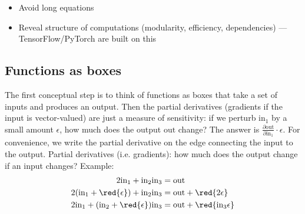 \begin{itemize}
\item Avoid long equations
\item Reveal structure of computations (modularity, efficiency, dependencies) --- TensorFlow/PyTorch are built on this
\end{itemize}




\subsection{Functions as boxes}
The first conceptual step is to think of functions as boxes that take a set of inputs and produces an output.
%
Then the partial derivatives (gradients if the input is vector-valued) are just a measure of sensitivity:
%
if we perturb $\text{in}_1$ by a small amount $\epsilon$, how much does the output $\text{out}$ change?
%
The answer is $\frac{\partial\text{out}}{\partial\text{in}_1} \cdot \epsilon$.
%
For convenience, we write the partial derivative on the edge connecting the input to the output.
% 
Partial derivatives (i.e. gradients): how much does the output change if an input changes?
Example:
\begin{align*}
	2 \text{in}_1 + \text{in}_2 \text{in}_3 &= \text{out}\\
	2 (\text{in}_1 + \red{\epsilon}) + \text{in}_2 \text{in}_3 &= \text{out} + \red{2 \epsilon}\\
	2 \text{in}_1 + (\text{in}_2 + \red{\epsilon}) \text{in}_3 &= \text{out} + \red{\text{in}_3 \epsilon}	
\end{align*}

\begin{marginfigure}
\end{marginfigure}


